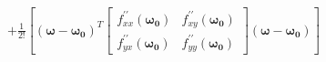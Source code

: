 \documentclass[preview]{standalone}
\begin{document}
\begin{align*}
+ \frac{1}{2 !}[ (\mathbf{\omega} - \mathbf{\omega_0})^T \begin{bmatrix} f_{xx}^{\prime \prime}(\mathbf{\omega_0}) & f_{xy}^{\prime \prime}(\mathbf{\omega_0}) \\ f_{yx}^{\prime \prime}(\mathbf{\omega_0}) & f_{yy}^{\prime \prime}(\mathbf{\omega_0}) \end{bmatrix} (\mathbf{\omega} - \mathbf{\omega_0})]
\end{align*}
\end{document}
